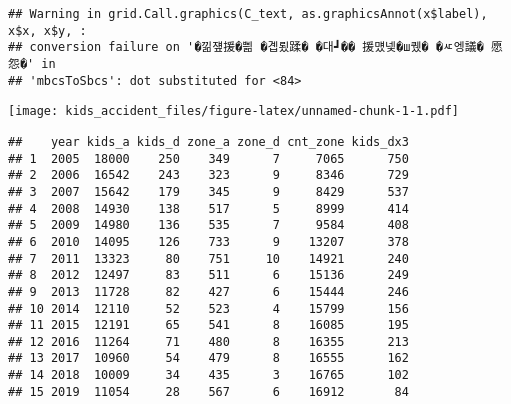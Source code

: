 \documentclass[
]{article}
\newenvironment{Shaded}{\begin{snugshade}}{\end{snugshade}}
\newcommand{\CommentTok}[1]{\textcolor[rgb]{0.56,0.35,0.01}{\textit{#1}}}
\newcommand{\DecValTok}[1]{\textcolor[rgb]{0.00,0.00,0.81}{#1}}
\newcommand{\NormalTok}[1]{#1}
\newcommand{\OperatorTok}[1]{\textcolor[rgb]{0.81,0.36,0.00}{\textbf{#1}}}
\newcommand{\StringTok}[1]{\textcolor[rgb]{0.31,0.60,0.02}{#1}}
\begin{document}
\begin{verbatim}
## Warning in grid.Call.graphics(C_text, as.graphicsAnnot(x$label), x$x, x$y, :
## conversion failure on '�낆쟾援�쁾 �곕룄蹂� �대┛�� 援먰넻�ш퀬� �ㅼ엥議� 愿怨�' in
## 'mbcsToSbcs': dot substituted for <84>
\end{verbatim}

\texttt{[image: kids\_accident\_files/figure-latex/unnamed-chunk-1-1.pdf]}

\begin{Shaded}
\end{Shaded}

\begin{verbatim}
##    year kids_a kids_d zone_a zone_d cnt_zone kids_dx3
## 1  2005  18000    250    349      7     7065      750
## 2  2006  16542    243    323      9     8346      729
## 3  2007  15642    179    345      9     8429      537
## 4  2008  14930    138    517      5     8999      414
## 5  2009  14980    136    535      7     9584      408
## 6  2010  14095    126    733      9    13207      378
## 7  2011  13323     80    751     10    14921      240
## 8  2012  12497     83    511      6    15136      249
## 9  2013  11728     82    427      6    15444      246
## 10 2014  12110     52    523      4    15799      156
## 11 2015  12191     65    541      8    16085      195
## 12 2016  11264     71    480      8    16355      213
## 13 2017  10960     54    479      8    16555      162
## 14 2018  10009     34    435      3    16765      102
## 15 2019  11054     28    567      6    16912       84
\end{verbatim}
\end{document}
